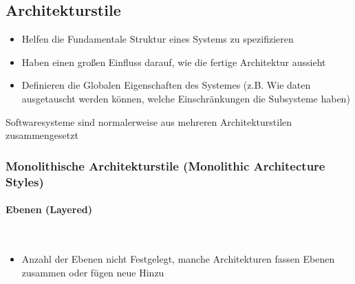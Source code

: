 \documentclass[ngerman,color=3b]{tuda_summary}
\begin{document}
\subsection{Architekturstile}
\begin{itemize}
    \item Helfen die Fundamentale Struktur eines Systems zu spezifizieren
    \item Haben einen großen Einfluss darauf, wie die fertige Architektur aussieht
    \item Definieren die Globalen Eigenschaften des Systemes (z.B. Wie daten ausgetauscht werden können, welche Einschränkungen die Subsysteme haben)
\end{itemize}
Softwaresysteme sind normalerweise aus mehreren Architekturstilen zusammengesetzt
\clearpage
\subsubsection{Monolithische Architekturstile (Monolithic Architecture Styles)}
\paragraph{Ebenen (Layered)}\mbox{}\\
\begin{figure}[h]
    \centering
\end{figure}
\FloatBarrier
\begin{itemize}
    \item Anzahl der Ebenen nicht Festgelegt, manche Architekturen fassen Ebenen zusammen oder fügen neue Hinzu
\end{itemize}
\end{document}
